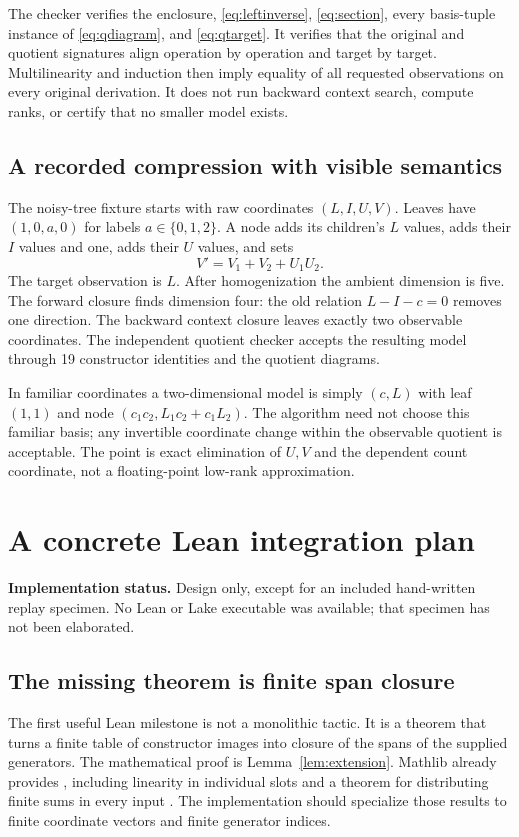 \documentclass[11pt,letterpaper]{article}
\theoremstyle{definition}\newtheorem{definition}[theorem]{Definition}
\theoremstyle{remark}\newtheorem{remark}[theorem]{Remark}
\newcommand{\code}[1]{\texttt{\detokenize{#1}}}
\newcommand{\status}[1]{\par\noindent\textbf{Implementation status.} #1\par}
\begin{document}
The checker verifies the enclosure, \eqref{eq:leftinverse}, \eqref{eq:section}, every basis-tuple instance of \eqref{eq:qdiagram}, and \eqref{eq:qtarget}. It verifies that the original and quotient signatures align operation by operation and target by target. Multilinearity and induction then imply equality of all requested observations on every original derivation. It does not run backward context search, compute ranks, or certify that no smaller model exists.

\subsection{A recorded compression with visible semantics}
The noisy-tree fixture starts with raw coordinates $(L,I,U,V)$. Leaves have $(1,0,a,0)$ for labels $a\in\{0,1,2\}$. A node adds its children's $L$ values, adds their $I$ values and one, adds their $U$ values, and sets
\[
 V'=V_1+V_2+U_1U_2.
\]
The target observation is $L$. After homogenization the ambient dimension is five. The forward closure finds dimension four: the old relation $L-I-c=0$ removes one direction. The backward context closure leaves exactly two observable coordinates. The independent quotient checker accepts the resulting model through 19 constructor identities and the quotient diagrams.

In familiar coordinates a two-dimensional model is simply $(c,L)$ with leaf $(1,1)$ and node $(c_1c_2,L_1c_2+c_1L_2)$. The algorithm need not choose this familiar basis; any invertible coordinate change within the observable quotient is acceptable. The point is exact elimination of $U,V$ and the dependent count coordinate, not a floating-point low-rank approximation.

\section{A concrete Lean integration plan}
\label{sec:lean}
\status{Design only, except for an included hand-written replay specimen. No Lean or Lake executable was available; that specimen has not been elaborated.}

\subsection{The missing theorem is finite span closure}
The first useful Lean milestone is not a monolithic tactic. It is a theorem that turns a finite table of constructor images into closure of the spans of the supplied generators. The mathematical proof is Lemma~\ref{lem:extension}. Mathlib already provides \code{MultilinearMap}, including linearity in individual slots and a \code{map_sum} theorem for distributing finite sums in every input \cite{mathlib-multilinear}. The implementation should specialize those results to finite coordinate vectors and finite generator indices.
\end{document}
